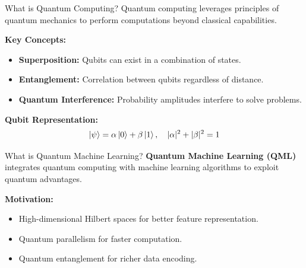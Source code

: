 \documentclass{beamer}
\begin{document}
\begin{frame}{What is Quantum Computing?}
Quantum computing leverages principles of quantum mechanics to perform computations beyond classical capabilities.

\vspace{10pt}
\textbf{Key Concepts:}
\begin{itemize}
\item \textbf{Superposition:} Qubits can exist in a combination of states.
\item \textbf{Entanglement:} Correlation between qubits regardless of distance.
\item \textbf{Quantum Interference:} Probability amplitudes interfere to solve problems.
\end{itemize}

\textbf{Qubit Representation:}
\[
\ket{\psi} = \alpha \ket{0} + \beta \ket{1}, \quad |\alpha|^2 + |\beta|^2 = 1
\]
\end{frame}


\begin{frame}{What is Quantum Machine Learning?}
\textbf{Quantum Machine Learning (QML)} integrates quantum computing with machine learning algorithms to exploit quantum advantages.

\vspace{10pt}
\textbf{Motivation:}
\begin{itemize}
    \item High-dimensional Hilbert spaces for better feature representation.
    \item Quantum parallelism for faster computation.
    \item Quantum entanglement for richer data encoding.
\end{itemize}


\end{frame}
\end{document}
